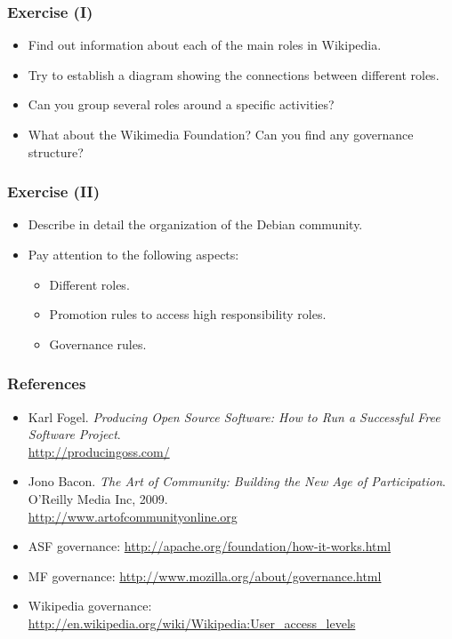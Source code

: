 \documentclass{beamer}
\begin{document}

\begin{frame}
 \frametitle{Exercise (I)}
 \begin{itemize}
  \item Find out information about each of the main roles in Wikipedia.
  \item Try to establish a diagram showing the connections between different roles.
  \item Can you group several roles around a specific activities?
  \item What about the Wikimedia Foundation? Can you find any governance structure?
  \end{itemize}

\end{frame}


\begin{frame}
 \frametitle{Exercise (II)}
 \begin{itemize}
  \item Describe in detail the organization of the Debian community.
  \item Pay attention to the following aspects:
  \begin{itemize}
   \item Different roles.
   \item Promotion rules to access high responsibility roles.
   \item Governance rules.
  \end{itemize}

 \end{itemize}

\end{frame}


\begin{frame}
 \frametitle{References}
 \begin{itemize}
 \item Karl Fogel. \textit{Producing Open Source Software: How to Run
a Successful Free Software Project}.\\
 \url{http://producingoss.com/}
 \item Jono Bacon. \textit{The Art of Community: Building the New Age
of Participation}. O'Reilly Media Inc, 2009.\\
 \url{http://www.artofcommunityonline.org}
 \item ASF governance: \url{http://apache.org/foundation/how-it-works.html}
 \item MF governance: \url{http://www.mozilla.org/about/governance.html}
 \item Wikipedia governance: \url{http://en.wikipedia.org/wiki/Wikipedia:User_access_levels}
 \end{itemize}
\end{frame}

\end{document}
